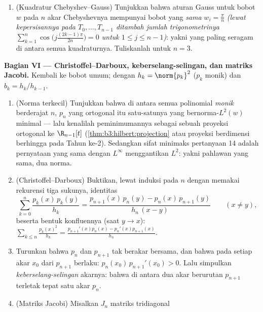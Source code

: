\begin{problem}
\begin{enumerate}[resume]
        $\intcc{-1}1$ dapat berturunan sebesar $n^2$
        di tepinya (dan ketaksamaan Markov mengatakan tak lebih besar ---
        pernyataannya saja). Di manakah pada selangnya
        batas turunannya hanya $O(n)$?
  \item (Kuadratur Chebyshev--Gauss) Tunjukkan bahwa aturan Gauss
        untuk bobot $w$ pada $n$ akar Chebyshevnya
        mempunyai bobot yang \emph{sama} $w_i = \frac\pi n$
        \emph{(lewat kepersisannya pada $T_0, \dots, T_{n-1}$ ditambah
        jumlah trigonometrinya
        $\sum_{k=1}^n\cos\bigl(j\tfrac{(2k-1)\pi}{2n}\bigr) =
        0$ untuk $1 \leq j \leq n - 1$)}: yakni yang paling seragam di antara
        semua kuadraturnya. Tuliskanlah untuk $n = 3$.
\end{enumerate}

\medskip
\noindent\textbf{Bagian VI --- Christoffel--Darboux,
keberselang-selingan, dan matriks Jacobi.} Kembali ke bobot umum;
dengan $h_k = \norm{p_k}^2$ ($p_k$ monik) dan $b_k = h_k/h_{k-1}$.
\begin{enumerate}[resume]
  \item (Norma terkecil) Tunjukkan bahwa di antara semua polinomial
        \emph{monik} berderajat $n$, $p_n$ yang ortogonal itu
        satu-satunya yang bernorma-$L^2(w)$ minimal --- lalu kenalilah
        peminimumannya sebagai sebuah proyeksi ortogonal ke
        $\R_{n-1}[t]$ (\cref{thm:b3:hilbert:projection} atau
        proyeksi berdimensi berhingga pada Tahun ke-2). Sedangkan
        sifat minimaks pertanyaan 14 adalah pernyataan yang sama
        dengan $L^\infty$ menggantikan $L^2$: yakni pahlawan yang sama, dua
        norma.
  \item (Christoffel--Darboux) Buktikan, lewat induksi pada $n$
        dengan memakai rekurensi tiga sukunya, identitas
        \[
        \sum_{k=0}^{n}\frac{p_k(x)\,p_k(y)}{h_k}
        = \frac{p_{n+1}(x)\,p_n(y) -
        p_n(x)\,p_{n+1}(y)}{h_n\,(x - y)}
        \qquad (x \neq y),
        \]
        beserta bentuk konfluennya (saat $y \to x$):
        $\sum_{k\leq n}\frac{p_k(x)^2}{h_k} =
        \frac{p_{n+1}'(x)p_n(x) - p_n'(x)p_{n+1}(x)}{h_n}$.
  \item Turunkan bahwa $p_n$ dan $p_{n+1}$ tak berakar bersama,
        dan bahwa pada setiap akar $x_0$ dari $p_{n+1}$ berlaku:
        $p_n(x_0)\,p_{n+1}'(x_0) > 0$. Lalu simpulkan
        \emph{keberselang-selingan} akarnya: bahwa di antara dua akar berurutan
        $p_{n+1}$ terletak tepat satu akar $p_n$.
  \item (Matriks Jacobi) Misalkan $J_n$ matriks tridiagonal

\end{enumerate}
\end{problem}
